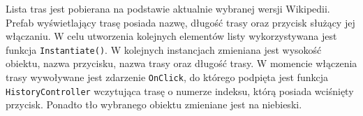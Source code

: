 Lista tras jest pobierana na podstawie aktualnie wybranej wersji Wikipedii. Prefab wyświetlający trasę posiada nazwę, długość trasy oraz przycisk służący jej włączaniu. W celu utworzenia kolejnych elementów listy wykorzystywana jest funkcja  \lstinline[basicstyle=\normalsize]{Instantiate()}. W kolejnych instancjach zmieniana jest wysokość obiektu, nazwa przycisku, nazwa trasy oraz długość trasy.  W momencie włączenia trasy wywoływane jest zdarzenie  \lstinline[basicstyle=\normalsize]{OnClick}, do którego podpięta jest funkcja  \lstinline[basicstyle=\normalsize]{HistoryController} wczytująca trasę o numerze indeksu, którą posiada wciśnięty przycisk. Ponadto tło wybranego obiektu zmieniane jest na niebieski.

